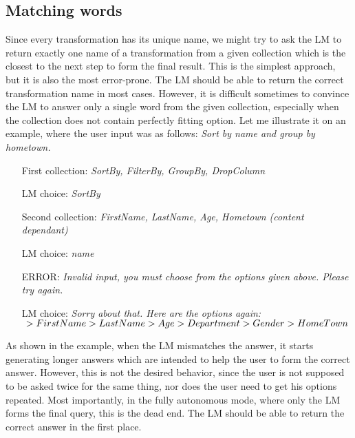 \documentclass[11pt]{article}
\begin{document}
\subsection{Matching words}

Since every transformation has its unique name, we might try to ask the LM to return exactly one name of a transformation from a given collection which is the closest to the next step to form the final result. This is the simplest approach, but it is also the most error-prone. The LM should be able to return the correct transformation name in most cases. However, it is difficult sometimes to convince the LM to answer only a single word from the given collection, especially when the collection does not contain perfectly fitting option. Let me illustrate it on an example, where the user input was as follows: \textit{Sort by name and group by hometown.}

\begin{enumerate}
    \item[First collection:]\textit{SortBy, FilterBy, GroupBy, DropColumn}
    \item[LM choice:]\textit{SortBy}
    \item[Second collection:]\textit{FirstName, LastName, Age, Hometown (content dependant)} 
    \item[LM choice:]\textit{name}
    \item[ERROR:]\textit{Invalid input, you must choose from the options given above. Please try again.}
    \item[LM choice:]\textit{Sorry about that. Here are the options again: \begin{math}
        \newline
        > First Name
        \newline
        > LastName
        \newline
        > Age
        \newline
        > Department
        \newline
        > Gender
        \newline
        > HomeTown
        \newline
        \end{math}} 
\end{enumerate}

\pagebreak

As shown in the example, when the LM mismatches the answer, it starts generating longer answers which are intended to help the user to form the correct answer. However, this is not the desired behavior, since the user is not supposed to be asked twice for the same thing, nor does the user need to get his options repeated. Most importantly, in the fully autonomous mode, where only the LM forms the final query, this is the dead end. The LM should be able to return the correct answer in the first place.
\end{document}
